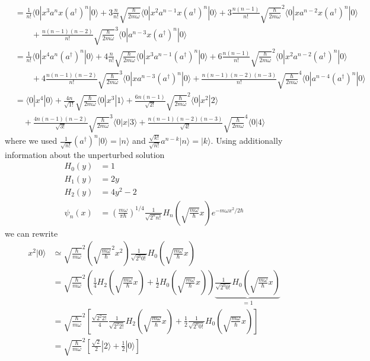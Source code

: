 \documentclass[../main.tex]{subfiles}
\begin{document}
\begin{align}
&=\frac{1}{n!}\langle0|x^3a^nx(a^\dagger)^n|0\rangle+
3\frac{n}{n!}\sqrt{\frac{\hbar}{2m\omega}}\langle0|x^2a^{n-1}x(a^\dagger)^n|0\rangle+3\frac{n(n-1)}{n!}\sqrt{\frac{\hbar}{2m\omega}}^2\langle0|xa^{n-2}x(a^\dagger)^n|0\rangle\\
&\qquad+\frac{n(n-1)(n-2)}{n!}\sqrt{\frac{\hbar}{2m\omega}}^3\langle0|a^{n-3}x(a^\dagger)^n|0\rangle\\
&=\frac{1}{n!}\langle0|x^4a^n(a^\dagger)^n|0\rangle+
4\frac{n}{n!}\sqrt{\frac{\hbar}{2m\omega}}\langle0|x^3a^{n-1}(a^\dagger)^n|0\rangle+6\frac{n(n-1)}{n!}\sqrt{\frac{\hbar}{2m\omega}}^2\langle0|x^2a^{n-2}(a^\dagger)^n|0\rangle\\
&\qquad+4\frac{n(n-1)(n-2)}{n!}\sqrt{\frac{\hbar}{2m\omega}}^3\langle0|xa^{n-3}(a^\dagger)^n|0\rangle+\frac{n(n-1)(n-2)(n-3)}{n!}\sqrt{\frac{\hbar}{2m\omega}}^4\langle0|a^{n-4}(a^\dagger)^n|0\rangle\\
&=\langle0|x^4|0\rangle+\frac{4n}{\sqrt{1!}}\sqrt{\frac{\hbar}{2m\omega}}\langle0|x^3|1\rangle+\frac{6n(n-1)}{\sqrt{2!}}\sqrt{\frac{\hbar}{2m\omega}}^2\langle0|x^2|2\rangle\\
&\quad+\frac{4n(n-1)(n-2)}{\sqrt{3!}}\sqrt{\frac{\hbar}{2m\omega}}^3\langle0|x|3\rangle+\frac{n(n-1)(n-2)(n-3)}{\sqrt{4!}}\sqrt{\frac{\hbar}{2m\omega}}^4\langle0|4\rangle
\end{align}
where we used $\frac{1}{\sqrt{n!}}(a^\dagger)^n|0\rangle=|n\rangle$ and $\frac{\sqrt{k!}}{\sqrt{n!}}a^{n-k}|n\rangle=|k\rangle$.
Using additionally information about the unperturbed solution
\begin{align}
H_0(y)&=1\\
H_1(y)&=2y\\
H_2(y)&=4y^2-2\\
\psi_n(x)&=\left(\frac{m\omega}{\pi\hbar}\right)^{1/4}\frac{1}{\sqrt{2^n n!}}H_n\left(\sqrt{\frac{m\omega}{\hbar}}x\right)e^{-m\omega x^2/2\hbar}
\end{align}
we can rewrite
\begin{align}
x^2|0\rangle
&\simeq \sqrt{\frac{\hbar}{m\omega}}^2\left(\sqrt{\frac{m\omega}{\hbar}}^2x^2\right)\frac{1}{\sqrt{2^0 0!}}H_0(\sqrt{\frac{m\omega}{\hbar}}x)\\
&=\sqrt{\frac{\hbar}{m\omega}}^2\left(\frac{1}{4}H_2(\sqrt{\frac{m\omega}{\hbar}}x)+\frac{1}{2}H_0(\sqrt{\frac{m\omega}{\hbar}}x)\right)\underbrace{\frac{1}{\sqrt{2^0 0!}}H_0(\sqrt{\frac{m\omega}{\hbar}}x)}_{=1}\\
&=\sqrt{\frac{\hbar}{m\omega}}^2\left[\frac{\sqrt{2^2 2!}}{4}\frac{1}{\sqrt{2^2 2!}}H_2(\sqrt{\frac{m\omega}{\hbar}}x)+\frac{1}{2}\frac{1}{\sqrt{2^0 0!}}H_0(\sqrt{\frac{m\omega}{\hbar}}x)\right]\\
&=\sqrt{\frac{\hbar}{m\omega}}^2\left[\frac{\sqrt{2}}{2}|2\rangle+\frac{1}{2}|0\rangle\right]
\end{align}
\end{document}
